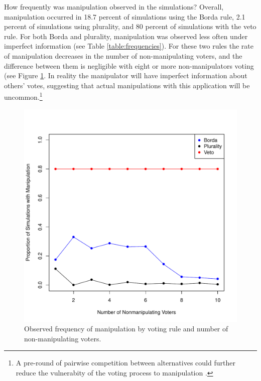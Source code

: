 \documentclass[12pt,letterpaper]{article} %
\begin{document}
How frequently was manipulation observed in the simulations? Overall, manipulation occurred in 18.7 percent of simulations using the Borda rule, 2.1 percent of simulations using plurality, and 80 percent of simulations with the veto rule. For both Borda and plurality, manipulation was observed less often under imperfect information (see Table \ref{table:frequencies}). For these two rules the rate of manipulation decreases in the number of non-manipulating voters, and the difference between them is negligible with eight or more non-manipulators voting (see Figure \ref{manipulation-frequency}. In reality the manipulator will have imperfect information about others' votes, suggesting that actual manipulations with this application will be uncommon.\footnote{A pre-round of pairwise competition between alternatives could further reduce the vulnerabity of the voting process to manipulation \citep{conitzer2003universal}.}



\begin{figure}[h!]
\begin{center}
\includegraphics[scale=0.4]{../graphics/manipulation-frequency.pdf}
\caption{Observed frequency of manipulation by voting rule and number of non-manipulating voters.}
\label{manipulation-frequency}
\end{center}
\end{figure}
\end{document}
